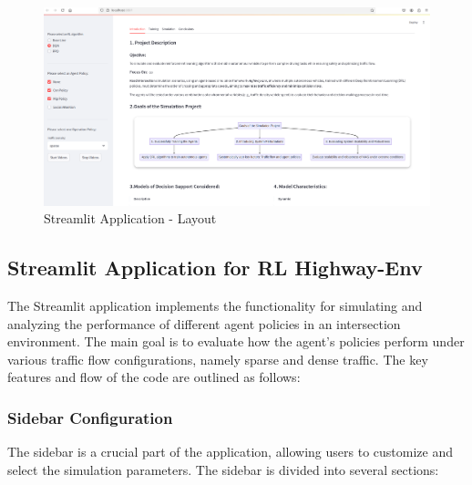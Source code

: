 \begin{figure}[H]
    \centering
    \includegraphics[height=0.35\textheight]{images/app_intro.png} 
    \caption{Streamlit Application - Layout}
\end{figure}


\subsection{Streamlit Application for RL Highway-Env}

The Streamlit application implements the functionality for simulating and analyzing the performance of different agent policies in an intersection environment.
The main goal is to evaluate how the agent's policies perform under various traffic flow configurations, namely sparse and dense traffic. 
The key features and flow of the code are outlined as follows:

\subsubsection{Sidebar Configuration}

The sidebar is a crucial part of the application, allowing users to customize and select the simulation parameters. The sidebar is divided into several sections:

